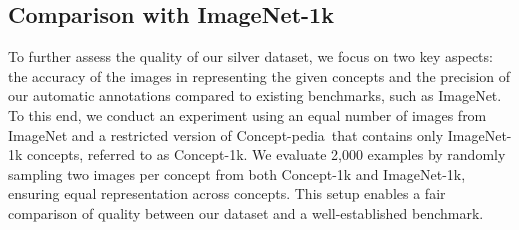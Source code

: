 \documentclass[11pt]{article}
\newcommand{\resource}{Concept-pedia}
\newcommand{\benchmark}{Concept-10k}
\begin{document}

\subsection{Comparison with ImageNet-1k}
\label{subsec:cn1k_in1k}
To further assess the quality of our silver dataset, we focus on two key aspects: the accuracy of the images in representing the given concepts and the precision of our automatic annotations compared to existing benchmarks, such as ImageNet.
To this end, we conduct an experiment using an equal number of images from ImageNet and a restricted version of \resource~that contains only ImageNet-1k concepts, referred to as Concept-1k.
We evaluate 2,000 examples by randomly sampling two images per concept from both Concept-1k and ImageNet-1k, ensuring equal representation across concepts. 
This setup enables a fair comparison of quality between our dataset and a well-established benchmark.
\end{document}

